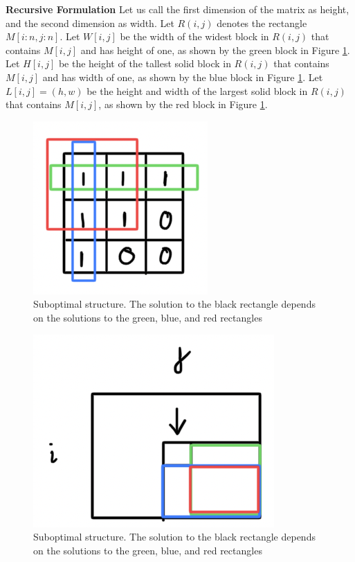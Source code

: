 \documentclass[12pt,article]{article}
\begin{document}
\textbf{Recursive Formulation}
Let us call the first dimension of the matrix as height, and the second dimension as width. Let $R(i,j)$ denotes the rectangle $M[i:n,j:n]$. Let $W[i,j]$ be the width of the widest block in $R(i,j)$ that contains $M[i,j]$ and has height of one, as shown by the green block in Figure \ref{fig:q4-notations}. Let $H[i,j]$ be the height of the tallest solid block in $R(i,j)$ that contains $M[i,j]$ and has width of one, as shown by the blue block in Figure \ref{fig:q4-notations}. Let $L[i,j] = (h,w)$ be the height and width of the largest solid block in $R(i,j)$ that contains $M[i,j]$, as shown by the red block in Figure \ref{fig:q4-notations}.

\begin{figure}[H]
    \centering
    \includegraphics[scale=0.7]{notation.png} \par
    \caption{Suboptimal structure. The solution to the black rectangle depends on the solutions to the green, blue, and red rectangles}
    \label{fig:q4-notations}
\end{figure}

\begin{figure}[H]
    \centering
    \includegraphics[scale=0.7]{recursion.png} \par
    \caption{Suboptimal structure. The solution to the black rectangle depends on the solutions to the green, blue, and red rectangles}
    \label{fig:q4-suboptimal-structure}
\end{figure}
\end{document}
